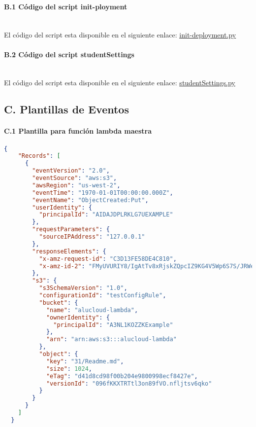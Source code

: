 \documentclass[
]{article}
\begin{document}
\hypertarget{header-n221}{%
\paragraph{B.1 Código del script init-ployment}\label{header-n221}}
\leavevmode
\newline
\\
El código del script esta disponible en el siguiente enlace:  \underline{\href{https://github.com/manujose94/FINAL-PROJECT-ICP/blob/main/init-deployment.py}{init-deployment.py}}\\

\hypertarget{header-n223}{%
\paragraph{B.2 Código del script studentSettings}\label{header-n223}}
\leavevmode
\newline
\\
El código del script esta disponible en el siguiente enlace:  \underline{\href{https://github.com/manujose94/FINAL-PROJECT-ICP/blob/main/studentSettings.py}{studentSettings.py}}\\

\hypertarget{header-n225}{%
\subsection{C. Plantillas de Eventos}\label{header-n225}}

\hypertarget{header-n226}{%
\paragraph{C.1 Plantilla para función lambda
maestra}\label{header-n226}}
\leavevmode
\newline
\begin{lstlisting}[language=json,firstnumber=1]
{
    "Records": [
      {
        "eventVersion": "2.0",
        "eventSource": "aws:s3",
        "awsRegion": "us-west-2",
        "eventTime": "1970-01-01T00:00:00.000Z",
        "eventName": "ObjectCreated:Put",
        "userIdentity": {
          "principalId": "AIDAJDPLRKLG7UEXAMPLE"
        },
        "requestParameters": {
          "sourceIPAddress": "127.0.0.1"
        },
        "responseElements": {
          "x-amz-request-id": "C3D13FE58DE4C810",
          "x-amz-id-2": "FMyUVURIY8/IgAtTv8xRjskZQpcIZ9KG4V5Wp6S7S/JRWeUWerMUE5JgHvANOjpD"
        },
        "s3": {
          "s3SchemaVersion": "1.0",
          "configurationId": "testConfigRule",
          "bucket": {
            "name": "alucloud-lambda",
            "ownerIdentity": {
              "principalId": "A3NL1KOZZKExample"
            },
            "arn": "arn:aws:s3:::alucloud-lambda"
          },
          "object": {
            "key": "31/Readme.md",
            "size": 1024,
            "eTag": "d41d8cd98f00b204e9800998ecf8427e",
            "versionId": "096fKKXTRTtl3on89fVO.nfljtsv6qko"
          }
        }
      }
    ]
  }
\end{lstlisting}
\end{document}

